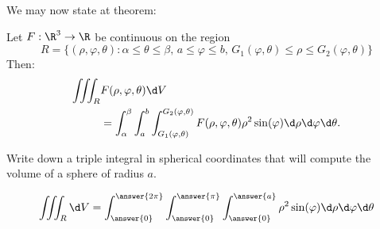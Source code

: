 \documentclass{ximera}
\begin{document}
We may now state at theorem:
\begin{theorem}
  Let $F:\R^3\to\R$ be continuous on the region
  \[
  R=\{(\rho,\varphi,\theta):\text{$\alpha\leq\theta\leq\beta$, $a\leq \varphi\leq b$, $G_1(\varphi,\theta)\le \rho\le G_2(\varphi,\theta)$}\}
  \]
  Then: 
  \begin{align*}
  \iiint_R &F(\rho,\varphi,\theta)\d V\\
  &= \int_\alpha^\beta\int_{a}^{b} \int_{G_1(\varphi,\theta)}^{G_2(\varphi,\theta)}F(\rho,\varphi,\theta) \rho^2 \sin(\varphi)\d\rho\d\varphi\d\theta.
  \end{align*}
\end{theorem}

\begin{question}
  Write down a triple integral in spherical coordinates that will
  compute the volume of a sphere of radius $a$.
  \begin{prompt}
  \[
  \iiint_R \d V = \int_{\answer{0}}^{\answer{2\pi}}
  \int_{\answer{0}}^{\answer{\pi}}
  \int_{\answer{0}}^{\answer{a}}
  \rho^2 \sin(\varphi)\d\rho\d\varphi\d\theta
  \]
  \end{prompt}
\end{question}


        
\end{document}
